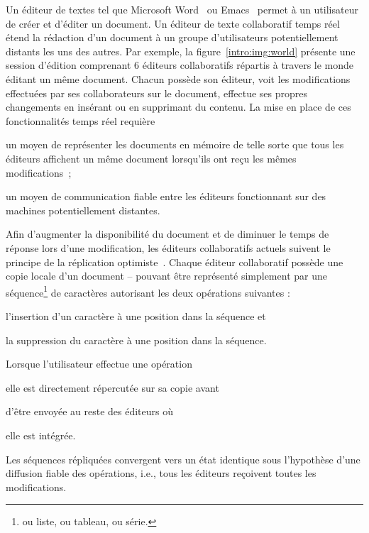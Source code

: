 Un éditeur de textes tel que Microsoft Word~\cite{word} ou
Emacs~\cite{emacs} permet à un utilisateur de créer et d'éditer un
document. Un éditeur de texte collaboratif temps réel~\cite{ellis1991groupware}
étend la rédaction d'un document à un groupe d'utilisateurs potentiellement
distants les uns des autres.  Par exemple, la figure~\ref{intro:img:world}
présente une session d'édition comprenant 6 éditeurs collaboratifs répartis à
travers le monde éditant un même document. Chacun possède son éditeur, voit les
modifications effectuées par ses collaborateurs sur le document, effectue ses
propres changements en insérant ou en supprimant du contenu.  La mise en place
de ces fonctionnalités temps réel requière
\begin{inparaenum}[(i)]
\item un moyen de représenter les documents en mémoire de telle sorte que tous
  les éditeurs affichent un même document lorsqu'ils ont reçu les mêmes
  modifications~\cite{burckhardt2014replicated, shapiro2011conflict};
\item un moyen de communication fiable entre les éditeurs fonctionnant sur des
  machines potentiellement distantes.
\end{inparaenum}

Afin d'augmenter la disponibilité du document et de diminuer le temps de réponse
lors d'une modification, les éditeurs collaboratifs actuels suivent le principe
de la réplication optimiste~\cite{saito2005optimistic}. Chaque éditeur
collaboratif possède une copie locale d'un document -- pouvant être représenté
simplement par une séquence\footnote{ou liste, ou tableau, ou série.} de
caractères autorisant les deux opérations suivantes :
\begin{inparaenum}[(a)]
\item l'insertion d'un caractère à une position dans la séquence et
\item la suppression du caractère à une position dans la séquence.
\end{inparaenum}
Lorsque l'utilisateur effectue une opération
\begin{inparaenum}[(i)]
\item elle est directement répercutée sur sa copie avant
\item d'être envoyée au reste des éditeurs où
\item elle est intégrée.
\end{inparaenum}
Les séquences répliquées convergent vers un état identique sous l'hypothèse
d'une diffusion fiable des opérations, i.e., tous les éditeurs reçoivent toutes
les modifications.

